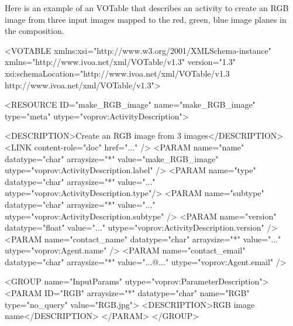 Here is an example of an  VOTable that describes an activity to create an RGB image from three input images mapped to the red, green, blue image planes in the composition. 

\begin{verbnobox}[\scriptsize]

<VOTABLE xmlns:xsi="http://www.w3.org/2001/XMLSchema-instance" 
    xmlns="http://www.ivoa.net/xml/VOTable/v1.3" version="1.3" 
    xsi:schemaLocation="http://www.ivoa.net/xml/VOTable/v1.3 
    http://www.ivoa.net/xml/VOTable/v1.3">
    
  <RESOURCE ID="make_RGB_image" name="make_RGB_image" 
      type="meta" utype="voprov:ActivityDescription">
      
    <DESCRIPTION>Create an RGB image from 3 images</DESCRIPTION>
    <LINK content-role="doc" href="..." />
    <PARAM name="name" datatype="char" arraysize="*" 
        value="make_RGB_image" utype="voprov:ActivityDescription.label" />
    <PARAM name="type" datatype="char" arraysize="*" 
        value="..." utype="voprov:ActivityDescription.type"/>
    <PARAM name="subtype" datatype="char" arraysize="*" 
        value="..." utype="voprov:ActivityDescription.subtype" />
    <PARAM name="version" datatype="float" 
        value="..." utype="voprov:ActivityDescription.version" />
    <PARAM name="contact_name" datatype="char" arraysize="*" 
        value="..." utype="voprov:Agent.name" />
    <PARAM name="contact_email" datatype="char" arraysize="*" 
        value="...@..." utype="voprov:Agent.email" />
        
    <GROUP name="InputParams" utype="voprov:ParameterDescription">
      <PARAM ID="RGB" arraysize="*" datatype="char" name="RGB" 
          type="no_query" value="RGB.jpg">
        <DESCRIPTION>RGB image name</DESCRIPTION>
      </PARAM>
    </GROUP>
		

\end{verbnobox}

